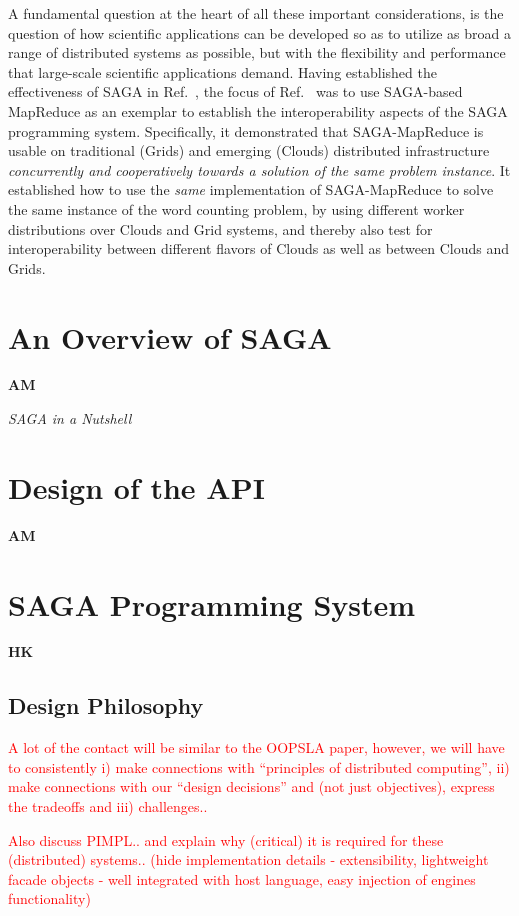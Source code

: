 \documentclass[10pt,letterpaper]{article}
\newcommand{\sagamapreduce }{SAGA-MapReduce }
\newcommand{\note}[1]{ {\textcolor{red}    { #1 }}}
\newcommand{\note}[1]{}
\begin{document}
A fundamental question at the heart of all these important considerations, is the question of how scientific applications can be developed so as to utilize as broad a range of distributed systems as possible, but with the flexibility and performance that large-scale scientific applications demand.  Having established the effectiveness of SAGA in Ref.~\cite{saga_ccgrid09}, the focus of Ref.~\cite{saga_interop09} was to use SAGA-based MapReduce as an exemplar to establish the interoperability aspects of the SAGA programming system.  Specifically, it demonstrated that \sagamapreduce is usable on traditional (Grids) and emerging (Clouds) distributed infrastructure {\it concurrently and cooperatively towards a solution of the same problem instance}.  It established how to use the {\it same} implementation of \sagamapreduce to solve the same instance of the word counting problem, by using different worker distributions over Clouds and Grid systems, and thereby also test for interoperability between different flavors of Clouds as well as between Clouds and Grids.


\section{An Overview of SAGA} {\bf AM}

{\it SAGA in a Nutshell}

\section{Design of the API} {\bf AM}

\section{SAGA Programming System} {\bf HK}

\subsection{Design Philosophy}

\note{A lot of the contact will be similar to the OOPSLA paper, however, we
will have to consistently i) make connections with ``principles of
distributed computing'', ii) make connections with our ``design
decisions'' and (not just objectives), express the tradeoffs and iii)
challenges..}

\note{Also discuss PIMPL..  and explain why (critical) it is required
for these (distributed) systems.. (hide implementation details - extensibility,
lightweight facade objects - well integrated with host language,
easy injection of engines functionality)}
\end{document}
